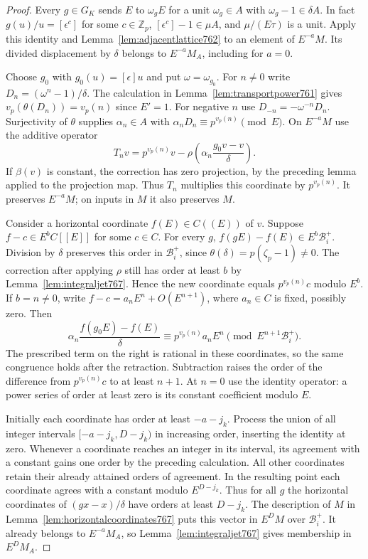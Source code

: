 \documentclass[a4paper,11pt]{article}
\theoremstyle{definition}
\theoremstyle{remark}
\newcommand{\ZZ}{\mathbb Z}\newcommand{\ord}{\operatorname{ord}}
\numberwithin{equation}{section}
\begin{document}
\begin{proof}
Every \(g\in G_K\) sends \(E\) to \(\omega_g E\) for a
unit \(\omega_g\in A\) with \(\omega_g-1\in\delta A\).
In fact \(g(u)/u=[\epsilon^c]\) for some \(c\in\ZZ_p\),
\([\epsilon^c]-1\in\mu A\), and \(\mu/(E\tau)\) is a
unit. Apply this identity and
Lemma~\ref{lem:adjacentlattice762} to an element of
\(E^{-a}M\). Its divided displacement by \(\delta\)
belongs to \(E^{-a}M_A\), including for \(a=0\).

Choose \(g_0\) with \(g_0(u)=[\epsilon]u\) and put
\(\omega=\omega_{g_0}\). For \(n\ne0\) write
\(D_n=(\omega^n-1)/\delta\). The calculation in
Lemma~\ref{lem:transportpower761} gives
\(v_p(\theta(D_n))=v_p(n)\) since \(E'=1\).
For negative \(n\) use \(D_{-n}=-\omega^{-n}D_n\).
Surjectivity of \(\theta\) supplies \(\alpha_n\in A\)
with \(\alpha_nD_n\equiv p^{v_p(n)}\pmod E\).
On \(E^{-a}M\) use the additive operator
\[
     T_n v=p^{v_p(n)}v-
             \rho\left(\alpha_n\frac{g_0v-v}{\delta}\right).
\]
If \(\beta(v)\) is constant, the correction has zero
projection, by the preceding lemma applied to the
projection map. Thus \(T_n\) multiplies this coordinate
by \(p^{v_p(n)}\). It preserves \(E^{-a}M\); on inputs
in \(M\) it also preserves \(M\).

Consider a horizontal coordinate \(f(E)\in C((E))\) of
\(v\). Suppose \(f-c\in E^b C[[E]]\) for some \(c\in C\).
For every \(g\), \(f(gE)-f(E)\in E^b\mathcal B_i^+\).
Division by \(\delta\) preserves this order in
\(\mathcal B_i^+\), since \(\theta(\delta)=p(\zeta_p-1)\ne0\).
The correction after applying \(\rho\) still has order
at least \(b\) by Lemma~\ref{lem:integraljet767}. Hence
the new coordinate equals \(p^{v_p(n)}c\) modulo \(E^b\).
If \(b=n\ne0\), write \(f-c=a_n E^n+O(E^{n+1})\),
where \(a_n\in C\) is fixed, possibly zero. Then
\[
    \alpha_n\frac{f(g_0E)-f(E)}{\delta}
          \equiv p^{v_p(n)}a_n E^n\pmod {E^{n+1}\mathcal B_i^+}.
\]
The prescribed term on the right is rational in these
coordinates, so the same congruence holds after the
retraction. Subtraction raises the order of the difference
from \(p^{v_p(n)}c\) to at least \(n+1\). At \(n=0\) use
the identity operator: a power series of order at least
zero is its constant coefficient modulo \(E\).

Initially each coordinate has order at least \(-a-j_k\).
Process the union of all integer intervals
\([-a-j_k,D-j_k)\) in increasing order, inserting the
identity at zero. Whenever a coordinate reaches an integer
in its interval, its agreement with a constant gains one
order by the preceding calculation. All other coordinates
retain their already attained orders of agreement.
In the resulting point each coordinate agrees with a
constant modulo \(E^{D-j_k}\). Thus for all \(g\) the
horizontal coordinates of \((gx-x)/\delta\) have orders
at least \(D-j_k\). The description of \(M\) in
Lemma~\ref{lem:horizontalcoordinates767} puts this vector
in \(E^D M\) over \(\mathcal B_i^+\). It already belongs
to \(E^{-a}M_A\), so Lemma~\ref{lem:integraljet767} gives
membership in \(E^D M_A\).


\end{proof}
\end{document}
